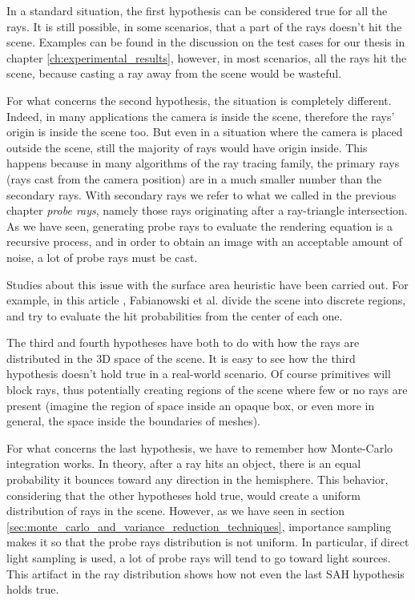 \documentclass{PoliMi_MasterThesis}
\begin{document}
In a standard situation, the first hypothesis can be considered true for all the rays. It is still possible, in some scenarios, that a part of the rays doesn't hit the scene. Examples can be found in the discussion on the test cases for our thesis in chapter \ref{ch:experimental_results}, however, in most scenarios, all the rays hit the scene, because casting a ray away from the scene would be wasteful.

For what concerns the second hypothesis, the situation is completely different. Indeed, in many applications the camera is inside the scene, therefore the rays' origin is inside the scene too. But even in a situation where the camera is placed outside the scene, still the majority of rays would have origin inside. This happens because in many algorithms of the ray tracing family, the primary rays (rays cast from the camera position) are in a much smaller number than the secondary rays. With secondary rays we refer to what we called in the previous chapter \textit{probe rays}, namely those rays originating after a ray-triangle intersection. As we have seen, generating probe rays to evaluate the rendering equation is a recursive process, and in order to obtain an image with an acceptable amount of noise, a lot of probe rays must be cast.

Studies about this issue with the surface area heuristic have been carried out. For example, in this article \cite{sah_interior_rays}, Fabianowski et al. divide the scene into discrete regions, and try to evaluate the hit probabilities from the center of each one.

The third and fourth hypotheses have both to do with how the rays are distributed in the 3D space of the scene. It is easy to see how the third hypothesis doesn't hold true in a real-world scenario. Of course primitives will block rays, thus potentially creating regions of the scene where few or no rays are present (imagine the region of space inside an opaque box, or even more in general, the space inside the boundaries of meshes). 

For what concerns the last hypothesis, we have to remember how Monte-Carlo integration works. In theory, after a ray hits an object, there is an equal probability it bounces toward any direction in the hemisphere. This behavior, considering that the other hypotheses hold true, would create a uniform distribution of rays in the scene. However, as we have seen in section \ref{sec:monte_carlo_and_variance_reduction_techniques}, importance sampling makes it so that the probe rays distribution is not uniform. In particular, if direct light sampling is used, a lot of probe rays will tend to go toward light sources. This artifact in the ray distribution shows how not even the last SAH hypothesis holds true.
\end{document}
